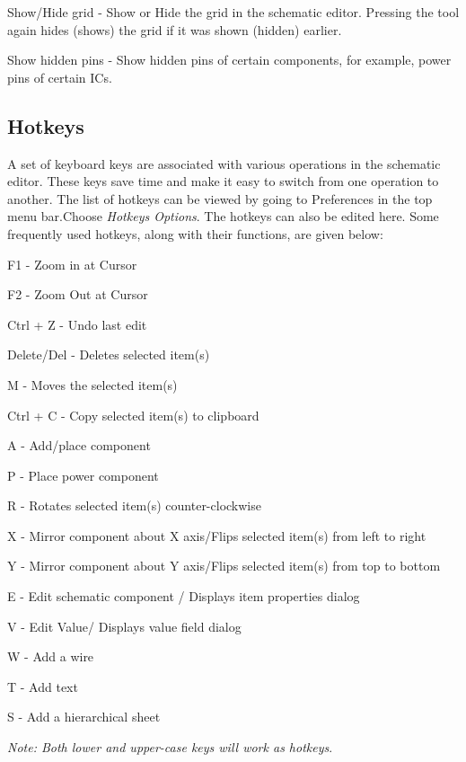\begin{compactenum}
\item Show/Hide grid - Show or Hide the grid in the schematic editor. Pressing the tool again hides (shows) the grid if it was shown (hidden) earlier.
\item Show hidden pins - Show hidden pins of certain components, for  example, power pins of certain ICs. 
\end{compactenum}

\subsection{Hotkeys}
\label{short}
A set of keyboard keys are associated with various operations in the
schematic editor. These keys save time and make it easy to switch from
one operation to another. The list of hotkeys can be viewed by going
to Preferences in the top menu bar.Choose \textit{Hotkeys Options}. The hotkeys can also be edited here. Some frequently used hotkeys, along with their functions, are given below:
\begin{compactitem}
\item F1 - Zoom in at Cursor
\item F2 - Zoom Out at Cursor
\item Ctrl + Z - Undo last edit
\item Delete/Del - Deletes selected item(s)
\item M - Moves the selected item(s)
\item Ctrl + C - Copy selected item(s) to clipboard
\item A - Add/place component 
\item P - Place power component
\item R - Rotates selected item(s) counter-clockwise
\item X - Mirror component about X axis/Flips selected item(s) from left to right
\item Y - Mirror component about Y axis/Flips selected item(s) from top to bottom
\item E - Edit schematic component / Displays item properties dialog
\item V - Edit Value/ Displays value field dialog
\item W - Add a wire
\item T - Add text
\item S - Add a hierarchical sheet
\end{compactitem}
\textit{Note: Both lower and upper-case keys will work as hotkeys}. 

